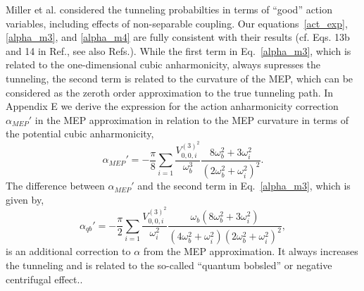 \documentclass[journal=jpcafh,manuscript=article]{achemso}
\begin{document}
Miller et al.\cite{miller90} considered the tunneling probabilties in
terms of ``good'' action variables, including effects of non-separable
coupling.  Our equations~\ref{act_exp}, \ref{alpha_m3}, and
\ref{alpha_m4} are fully consistent with their results (cf. Eqs. 13b
and 14 in Ref.\cite{miller90}, see also
Refs.\cite{greene15,greene16}). While the first term in
Eq.~\ref{alpha_m3}, which is related to the one-dimensional cubic
anharmonicity, always supresses the tunneling, the second term is
related to the curvature of the MEP, which can be considered as the
zeroth order approximation to the true tunneling
path.\cite{truhlar71,marcus77} In Appendix E we derive the expression
for the action anharmonicity correction $\alpha_{MEP}'$ in the MEP
approximation in relation to the MEP curvature in terms of the potential
cubic anharmonicity,
\begin{equation}
  \label{mep_alpha}
  \alpha_{MEP}'=-\frac{\pi}{8}\sum_{i=1}\frac{V_{0,0,i}^{(3)^2}}{\omega_b^3}
  \frac{8\omega_b^2+3\omega_i^2}{(2\omega_b^2+\omega_i^2)^2}.
\end{equation}
The difference between $\alpha_{MEP}'$ and the second term in
Eq.~\ref{alpha_m3}, which is given by,
\begin{equation}
  \label{bob_alpha}
  \alpha_{qb}'=-\frac{\pi}{2}\sum_{i=1}\frac{V_{0,0,i}^{(3)^2}}{\omega_i^2}
  \frac{\omega_b(8\omega_b^2+3\omega_i^2)}{(4\omega_b^2+\omega_i^2)(2\omega_b^2+\omega_i^2)^2},
\end{equation}
is an additional correction to $\alpha$ from the MEP
approximation. It always increases the tunneling and is related to
the so-called ``quantum bobsled'' or negative centrifugal
effect.\cite{marcus66,scodje81}.
\end{document}
